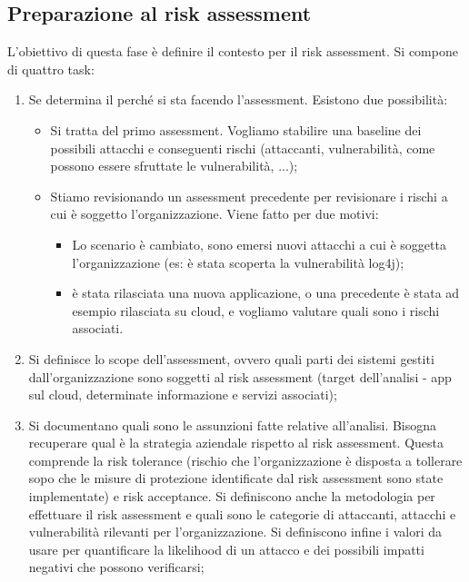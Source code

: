 \subsection{Preparazione al risk assessment}
L'obiettivo di questa fase è definire il contesto per il risk assessment. Si compone di quattro task:
\begin{enumerate}
    \item Se determina il perché si sta facendo l'assessment. Esistono due possibilità:
    \begin{itemize}
        \item Si tratta del primo assessment. Vogliamo stabilire una baseline dei possibili attacchi e conseguenti rischi (attaccanti, vulnerabilità, come possono essere sfruttate le vulnerabilità, ...);
        \item Stiamo revisionando un assessment precedente per revisionare i rischi a cui è soggetto l'organizzazione. Viene fatto per due motivi:
        \begin{itemize}
            \item Lo scenario è cambiato, sono emersi nuovi attacchi a cui è soggetta l'organizzazione (es: è stata scoperta la vulnerabilità log4j);
            \item è stata rilasciata una nuova applicazione, o una precedente è stata ad esempio rilasciata su cloud, e vogliamo valutare quali sono i rischi associati. 
        \end{itemize}
    \end{itemize}

    \item Si definisce lo scope dell'assessment, ovvero quali parti dei sistemi gestiti dall'organizzazione sono soggetti al risk assessment (target dell'analisi - app sul cloud, determinate informazione e servizi associati);

    \item Si documentano quali sono le assunzioni fatte relative all'analisi. Bisogna recuperare qual è la strategia aziendale rispetto al risk assessment. Questa comprende la risk tolerance (rischio che l'organizzazione è disposta a tollerare sopo che le misure di protezione identificate dal risk assessment sono state implementate) e risk acceptance. Si definiscono anche la metodologia per effettuare il risk assessment e quali sono le categorie di attaccanti, attacchi e vulnerabilità rilevanti per l'organizzazione. Si definiscono infine i valori da usare per quantificare la likelihood di un attacco e dei possibili impatti negativi che possono verificarsi;


\end{enumerate}
